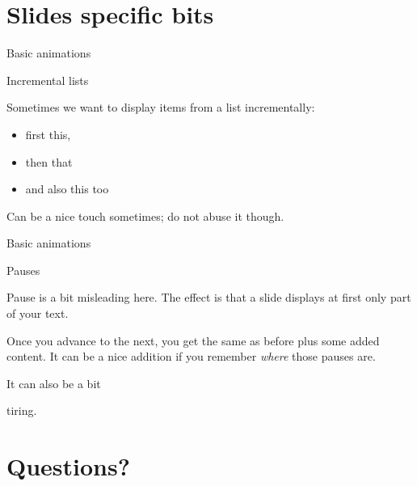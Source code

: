 \documentclass[10pt,compress]{beamer}
\providecommand{\tightlist}{%
\setlength{\itemsep}{0pt}\setlength{\parskip}{0pt}}
\begin{document}
\section{Slides specific bits}\label{slides-specific-bits}

\begin{frame}{Basic animations}

\begin{block}{Incremental lists}

Sometimes we want to display items from a list incrementally:

\begin{itemize}[<+->]
\tightlist
\item
  first this,
\item
  then that
\item
  and also this too
\end{itemize}

Can be a nice touch sometimes; do not abuse it though.

\end{block}

\end{frame}

\begin{frame}{Basic animations}

\begin{block}{Pauses}

Pause is a bit misleading here. The effect is that a slide displays at
first only part of your text.

\pause

Once you advance to the next, you get the same as before plus some added
content. It can be a nice addition if you remember \emph{where} those
pauses are.

\pause

It can also be a bit

\pause

tiring.

\end{block}

\end{frame}

\section{Questions?}\label{questions}
\end{document}

